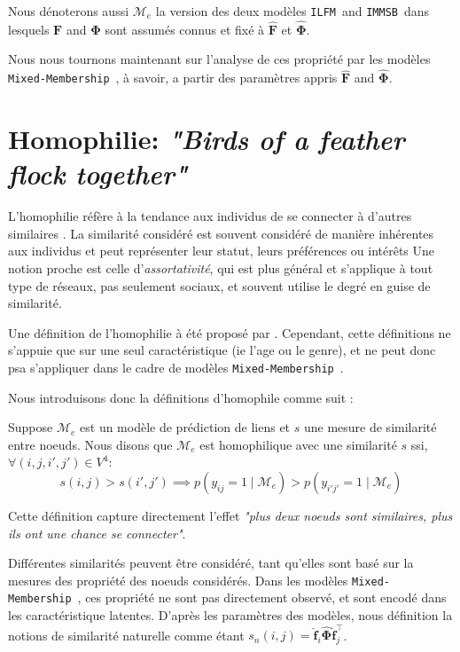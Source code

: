 \documentclass[french]{hermes-journal}
\newcommand{\ilfm}{\texttt{ILFM}}
\newcommand{\immsb}{\texttt{IMMSB}}
\newcommand{\mmm}{\texttt{Mixed-Membership}~}
\newcommand{\pr}{p}
\newcommand{\mat}[1]{\bm{#1}}
\begin{document}
Nous dénoterons aussi $\mathcal{M}_e$ la version des deux modèles \ilfm\ and \immsb\ dans lesquels $\mat{F}$ and $\mat{\Phi}$ sont assumés connus et fixé à $\mat{\hat{F}}$ et  $\mat{\hat{\Phi}}$.

Nous nous tournons maintenant sur l'analyse de ces propriété par les modèles \mmm, à savoir, a partir des paramètres appris $\mat{\hat{F}}$ and $\mat{\hat{\Phi}}$.


\section{Homophilie: \emph{"Birds of a feather flock together"}}
\label{sec:homophily}

L'homophilie réfère à la tendance aux individus de se connecter à d'autres similaires  \cite{mcpherson2001birds,lazarsfeld1954friendship}. La similarité considéré est souvent considéré de manière inhérentes aux individus et peut représenter leur statut, leurs préférences ou intérêts Une notion proche est celle d'\emph{assortativité}, qui est plus général et s'applique à tout type de réseaux, pas seulement sociaux, et souvent utilise le degré en guise de similarité.


Une définition de l'homophilie à été proposé par \cite{la2010randomization}. Cependant, cette définitions ne s'appuie que sur une seul caractéristique (ie l'age ou le genre), et ne peut donc psa s'appliquer dans le cadre de modèles \mmm.

Nous introduisons donc la définitions d'homophile comme suit : 
\begin{definition}[Homophilie] \label{def:homophily}
    Suppose $\mathcal{M}_e$ est un modèle de prédiction de liens et $s$ une mesure de similarité entre noeuds. Nous disons que $\mathcal{M}_e$ est homophilique avec une similarité $s$ ssi, $\forall (i,j,i',j') \in V^4$:
\begin{equation}
s(i,j) > s(i',j')  \implies \pr(y_{ij}=1 \mid \mathcal{M}_e) > \pr(y_{i'j'}=1  \mid \mathcal{M}_e) \nonumber
\end{equation}

\end{definition}

\noindent Cette définition capture directement l'effet \emph{"plus deux noeuds sont similaires, plus ils ont une chance se connecter"}. 

Différentes similarités peuvent être considéré, tant qu'elles sont basé sur la mesures des propriété des noeuds considérés. Dans les modèles \mmm, ces propriété ne sont pas directement observé, et sont encodé dans les caractéristique latentes. D'après les paramètres des modèles, nous définition la notions de similarité naturelle comme étant $s_n(i,j) = \mat{\hat{f}}_{i} \mat{\hat{\Phi}} \mat{\hat{f}}_j^\top$.
\end{document}
